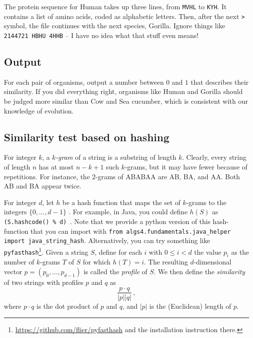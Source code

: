 \documentclass{tufte-handout}
\begin{document}
The protein sequence for Human takes up three lines, from {\tt MVHL} to {\tt KYH}.
It contains a list of amino acids, coded as alphabetic letters.
Then, after the next {\tt >} symbol, the file continues with the next species, Gorilla.
Ignore things like {\tt 2144721 HBHU 4HHB} -- I have no idea what that stuff even means!

\subsection{Output}

For each pair of organisms, output a number between $0$ and $1$ that describes their similarity.
If you did everything right, organisms like Human and Gorilla should be judged more similar than Cow and Sea cucumber, which is consistent with our knowledge of evolution.


\subsection{Similarity test based on hashing}

For integer $k$, a \emph{$k$-gram} of a string is a substring of length $k$.
Clearly, every string of length $n$ has at most $n-k+1$ such $k$-grams, but it may have fewer because of repetitions.
For instance, the $2$-grams of ABABAA are AB, BA, and AA.
Both AB and BA appear twice.

For integer $d$, let $h$ be a hash function that maps the set of $k$-grams to the integers $\{0,\ldots,d-1\}$ .
For example, in Java, you could define $h(S)$ as
{\tt (S.hashcode() \% d) }.
Note that we provide a python version of this hash-function that you can import with \texttt{from algs4.fundamentals.java\_helper import java\_string\_hash}.
Alternatively, you can try something like \texttt{pyfasthash}\footnote{\url{https://github.com/flier/pyfasthash} and the installation instruction there.}.
Given a string $S$, define for each $i$ with $0\leq i< d$ the value $p_i$ as the number of $k$-grams $T$ of $S$ for which $h(T) = i$.
The resulting $d$-dimensional vector $p=(p_0,\ldots,p_{d-1})$ is called the \emph{profile} of $S$.
We then define the \emph{similarity} of two strings with profiles $p$ and $q$ as
\[
    \frac{p\cdot q}{\left|p\right| \left|q\right|}\,,
\]
where $p\cdot q$ is the dot product
of $p$ and $q$, and $|p|$ is the (Euclidean) length of $p$.
\end{document}
